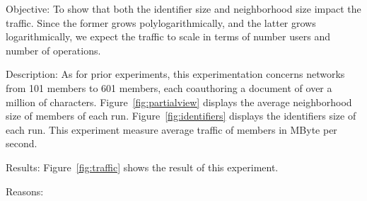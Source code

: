 \begin{asparadesc}
\item [Objective:] To show that both the identifier size and neighborhood size
  impact the traffic. Since the former grows polylogarithmically, and the latter
  grows logarithmically, we expect the traffic to scale in terms of number users
  and number of operations.
\item [Description:] As for prior experiments, this experimentation concerns
  networks from 101 members to 601 members, each coauthoring a document of over
  a million of characters. Figure~\ref{fig:partialview} displays the average
  neighborhood size of members of each run. Figure~\ref{fig:identifiers}
  displays the identifiers size of each run. This experiment measure average
  traffic of members in MByte per second.
\item [Results:] Figure~\ref{fig:traffic} shows the result of this experiment.
\item [Reasons:]
\end{asparadesc}

